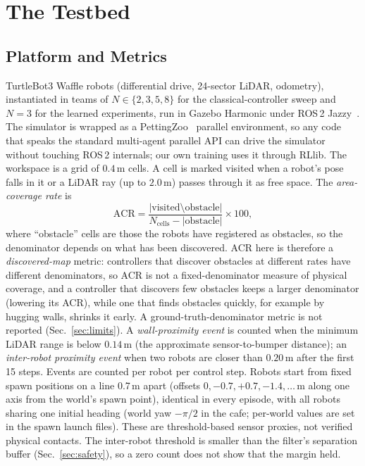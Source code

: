\documentclass[conference]{IEEEtran}
\newcommand{\si}[1]{\mathrm{#1}}
\begin{document}
\section{The Testbed}
\label{sec:testbed}
\subsection{Platform and Metrics}
TurtleBot3 Waffle robots (differential drive, 24-sector LiDAR, odometry), instantiated in teams of $N\in\{2,3,5,8\}$ for the classical-controller sweep and $N=3$ for the learned experiments,
run in Gazebo Harmonic under ROS\,2 Jazzy~\cite{macenski2022ros2,gazebo}. The
simulator is wrapped as a PettingZoo~\cite{terry2021pettingzoo} parallel
environment, so any code that speaks the standard multi-agent parallel API can drive the simulator without touching ROS\,2 internals; our own training uses it through RLlib. The workspace is a grid of $0.4\,\si{m}$ cells. A cell is marked
visited when a robot's pose falls in it or a LiDAR ray (up to $2.0\,\si{m}$)
passes through it as free space. The \emph{area-coverage rate} is
\begin{equation}
\mathrm{ACR}=\frac{|\text{visited}\setminus\text{obstacle}|}
{N_{\text{cells}}-|\text{obstacle}|}\times100,
\end{equation}
where ``obstacle'' cells are those the robots have registered as obstacles, so
the denominator depends on what has been discovered. ACR here is therefore a \emph{discovered-map} metric: controllers that discover obstacles at different rates have different denominators, so ACR is not a fixed-denominator measure of physical coverage, and a controller that discovers few obstacles keeps a larger denominator (lowering its ACR), while one that finds obstacles quickly, for example by hugging walls, shrinks it early. A ground-truth-denominator metric is not reported (Sec.~\ref{sec:limits}). A \emph{wall-proximity event} is
counted when the minimum LiDAR range is below $0.14\,\si{m}$ (the approximate
sensor-to-bumper distance); an \emph{inter-robot proximity event} when two robots are closer
than $0.20\,\si{m}$ after the first 15 steps. Events are counted per robot per control step. Robots start from fixed spawn positions on a line 0.7\,m apart (offsets $0,-0.7,+0.7,-1.4,\dots$\,m along one axis from the world's spawn point), identical in every episode, with all robots sharing one initial heading (world yaw $-\pi/2$ in the cafe; per-world values are set in the spawn launch files). These are threshold-based sensor proxies, not verified physical contacts. The inter-robot threshold is
smaller than the filter's separation buffer (Sec.~\ref{sec:safety}), so a zero count
does not show that the margin held.
\end{document}
